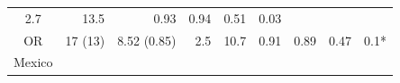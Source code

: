 \documentclass[fleqn,10pt,lineno]{wlpeerj} %
\theoremstyle{definition}
\theoremstyle{definition}
\theoremstyle{definition}
\theoremstyle{remark}
\begin{document}
\begin{longtable}[]{@{}crrrrllrl@{}}
\begin{minipage}[t]{0.04\columnwidth}
2.7\strut
\end{minipage} & \begin{minipage}[t]{0.05\columnwidth}\raggedleft\strut
13.5\strut
\end{minipage} & \begin{minipage}[t]{0.11\columnwidth}\raggedright\strut
0.93\strut
\end{minipage} & \begin{minipage}[t]{0.06\columnwidth}\raggedright\strut
0.94\strut
\end{minipage} & \begin{minipage}[t]{0.06\columnwidth}\raggedleft\strut
0.51\strut
\end{minipage} & \begin{minipage}[t]{0.07\columnwidth}\raggedright\strut
0.03\strut
\end{minipage}\tabularnewline
\begin{minipage}[t]{0.12\columnwidth}\centering\strut
OR\strut
\end{minipage} & \begin{minipage}[t]{0.08\columnwidth}\raggedleft\strut
17 (13)\strut
\end{minipage} & \begin{minipage}[t]{0.13\columnwidth}\raggedleft\strut
8.52 (0.85)\strut
\end{minipage} & \begin{minipage}[t]{0.04\columnwidth}\raggedleft\strut
2.5\strut
\end{minipage} & \begin{minipage}[t]{0.05\columnwidth}\raggedleft\strut
10.7\strut
\end{minipage} & \begin{minipage}[t]{0.11\columnwidth}\raggedright\strut
0.91\strut
\end{minipage} & \begin{minipage}[t]{0.06\columnwidth}\raggedright\strut
0.89\strut
\end{minipage} & \begin{minipage}[t]{0.06\columnwidth}\raggedleft\strut
0.47\strut
\end{minipage} & \begin{minipage}[t]{0.07\columnwidth}\raggedright\strut
0.1*\strut
\end{minipage}\tabularnewline
\begin{minipage}[t]{0.12\columnwidth}\centering\strut
Mexico\strut
\end{minipage} & \begin{minipage}[t]{0.08\columnwidth}\raggedleft\strut

\end{minipage}
\end{longtable}
\end{document}
